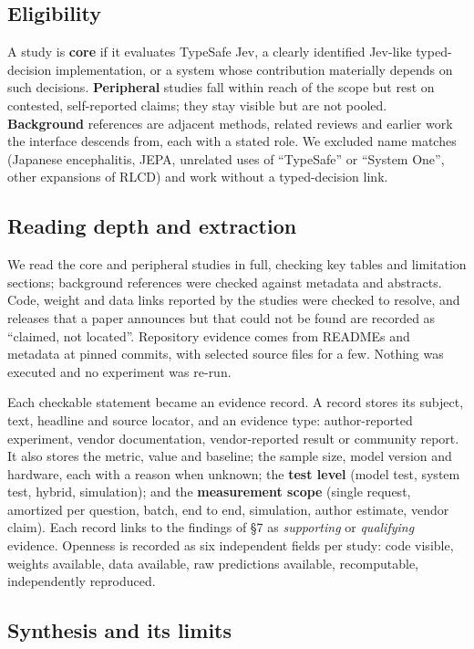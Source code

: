 \subsection{Eligibility}

A study is \textbf{core} if it evaluates TypeSafe Jev, a clearly identified Jev-like typed-decision implementation, or a system whose contribution materially depends on such decisions. \textbf{Peripheral} studies fall within reach of the scope but rest on contested, self-reported claims; they stay visible but are not pooled. \textbf{Background} references are adjacent methods, related reviews and earlier work the interface descends from, each with a stated role. We excluded name matches (Japanese encephalitis, JEPA, unrelated uses of “TypeSafe” or “System One”, other expansions of RLCD) and work without a typed-decision link.

\subsection{Reading depth and extraction}

We read the core and peripheral studies in full, checking key tables and limitation sections; background references were checked against metadata and abstracts. Code, weight and data links reported by the studies were checked to resolve, and releases that a paper announces but that could not be found are recorded as “claimed, not located”. Repository evidence comes from READMEs and metadata at pinned commits, with selected source files for a few. Nothing was executed and no experiment was re-run.

Each checkable statement became an evidence record. A record stores its subject, text, headline and source locator, and an evidence type: author-reported experiment, vendor documentation, vendor-reported result or community report. It also stores the metric, value and baseline; the sample size, model version and hardware, each with a reason when unknown; the \textbf{test level} (model test, system test, hybrid, simulation); and the \textbf{measurement scope} (single request, amortized per question, batch, end to end, simulation, author estimate, vendor claim). Each record links to the findings of §7 as \emph{supporting} or \emph{qualifying} evidence. Openness is recorded as six independent fields per study: code visible, weights available, data available, raw predictions available, recomputable, independently reproduced.

\subsection{Synthesis and its limits}

